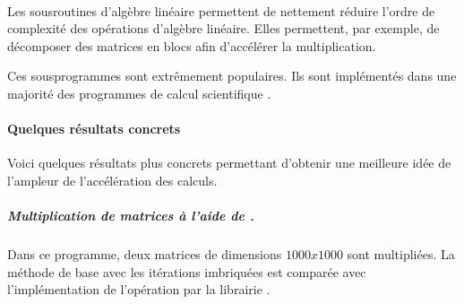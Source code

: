 \documentclass[letterpaper,10pt,french]{sphinxmanual}
\begin{document}
\paragraph{}
\label{\detokenize{preprocessing:blas}}
Les sous\sphinxhyphen{}routines d’algèbre linéaire permettent de nettement réduire l’ordre de complexité des opérations d’algèbre linéaire. Elles permettent, par exemple, de décomposer des matrices en blocs afin d’accélérer la multiplication.

Ces sous\sphinxhyphen{}programmes sont extrêmement populaires. Ils sont implémentés dans une majorité des programmes de calcul scientifique .


\paragraph{Quelques résultats concrets}
\label{\detokenize{preprocessing:quelques-resultats-concrets}}
Voici quelques résultats plus concrets permettant d’obtenir une meilleure idée de l’ampleur de l’accélération des calculs.


\subparagraph{Multiplication de matrices à l’aide de .}
\label{\detokenize{preprocessing:multiplication-de-matrices-a-laide-de-numpy}}
Dans ce programme, deux matrices de dimensions \(1000 x 1000\) sont multipliées. La méthode de base avec les itérations imbriquées est comparée avec l’implémentation de l’opération par la librairie .
\end{document}
